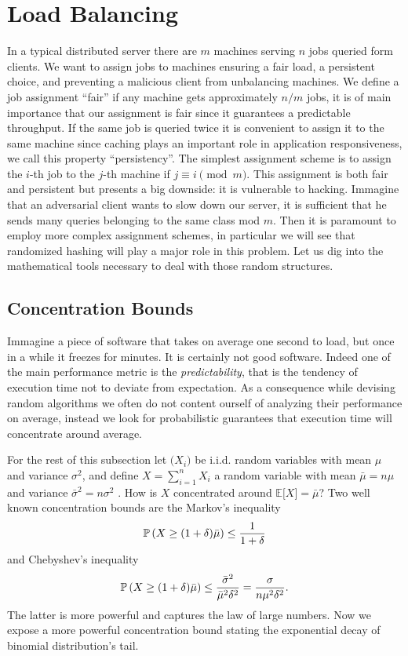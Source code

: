 \section{Load Balancing}

In a typical distributed server there are $m$ machines serving $n$ jobs
queried form clients. We want to assign jobs
to machines ensuring a fair load, a persistent choice, and preventing a
malicious client from unbalancing machines.
We define a job assignment ``fair'' if any machine gets approximately
$n / m$ jobs, it is of main importance that our assignment is fair since
it guarantees a predictable throughput.
If the same job is queried twice it is convenient to assign
it to the same machine since caching plays an important role in application
responsiveness, we call this property ``persistency''.  
The simplest assignment scheme is to assign the $i$-th job to the
$j$-th machine if $j \equiv i \pmod m$. This assignment is both fair and
persistent but presents a big downside: it is vulnerable to hacking. Immagine
that an adversarial client wants to slow down our server, it is sufficient
that he sends many queries belonging to the same class mod $m$. Then it is
paramount to employ more complex assignment schemes, in particular we will see
that randomized hashing will play a major role in this problem. Let us dig into
the mathematical tools necessary to deal with those random structures.

\subsection{Concentration Bounds}
Immagine a piece of
software that takes on average one second to load, but once in a while it
freezes for minutes. It is certainly not good software. Indeed one of the main
performance metric is the \textit{predictability}, that is the tendency
of execution
time not to deviate from expectation. As a consequence while devising
random algorithms we often do not content ourself of analyzing their
performance on average, instead we look for probabilistic guarantees
that execution time will concentrate around average.

For the rest of this subsection let $\bigl(X_i\bigr)$ be i.i.d. random
variables with mean $\mu$ and variance $\sigma^2$, and define $X = \sum_{i=1}^n X_i$ a random variable with mean $\bar{\mu} = n\mu$ and variance $\bar{\sigma}^2 = n\sigma^2$ . How is $X$ concentrated around $\mathbb{E}\bigl[X\bigr] = \bar{\mu}$?
Two well known concentration bounds are the Markov's inequality
\begin{equation*}
\operatorname{\mathbb{P}}\left(X \geq (1 + \delta)\bar{\mu}\right) \leq \frac{1}{1 + \delta}
\end{equation*}
and Chebyshev's inequality
\begin{equation*}
\operatorname{\mathbb{P}}\left(X \geq (1 + \delta)\bar{\mu}\right) \leq \frac{\bar{\sigma}^2}{ \bar{\mu}^2\delta^2} = \frac{\sigma}{n\mu^2\delta^2}.
\end{equation*}
The latter is more powerful and captures the law of large numbers. Now we expose
a more powerful concentration bound stating the exponential decay
of binomial distribution's tail.

